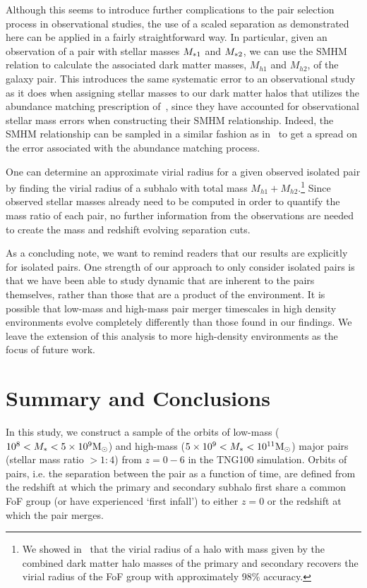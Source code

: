 \documentclass[twocolumn,linenumbers]{aastex631}
\newcommand{\chambe}{\citet{Chamberlain2024}}
\begin{document}
            Although this seems to introduce further complications to the pair selection process in observational studies, the use of a scaled separation as demonstrated here can be applied in a fairly straightforward way. 
            In particular, given an observation of a pair with stellar masses $M_{*{1}}$ and $M_{*{2}}$, we can use the SMHM relation to calculate the associated dark matter masses, $M_{h1}$ and $M_{h2}$, of the galaxy pair. 
            This introduces the same systematic error to an observational study as it does when assigning stellar masses to our dark matter halos that utilizes the abundance matching prescription of~\cite{Moster2013}, since they have accounted for observational stellar mass errors when constructing their SMHM relationship.
            Indeed, the SMHM relationship can be sampled in a similar fashion as in~\chambe{} to get a spread on the error associated with the abundance matching process.

            One can determine an approximate virial radius for a given observed isolated pair by finding the virial radius of a subhalo with total mass $M_{h1}+M_{h2}$.\footnote{We showed in~\chambe{} that the virial radius of a halo with mass given by the combined dark matter halo masses of the primary and secondary recovers the virial radius of the FoF group with approximately 98\% accuracy.}
            Since observed stellar masses already need to be computed in order to quantify the mass ratio of each pair, no further information from the observations are needed to create the mass and redshift evolving separation cuts. 

            As a concluding note, we want to remind readers that our results are explicitly for isolated pairs. 
            One strength of our approach to only consider isolated pairs is that we have been able to study dynamic that are inherent to the pairs themselves, rather than those that are a product of the environment. 
            It is possible that low-mass and high-mass pair merger timescales in high density environments evolve completely differently than those found in our findings. 
            We leave the extension of this analysis to more high-density environments as the focus of future work. 
   
\section{Summary and Conclusions}\label{sec:conclusions}
    In this study, we construct a sample of the orbits of low-mass ($10^8 <M_{*{}}<5\times10^{9}\mathrm{M}_\odot$) and high-mass ($5\times10^{9}<M_{*{}}<10^{11}\mathrm{M}_\odot$) major pairs (stellar mass ratio $> 1:4$) from $z=0-6$ in the TNG100 simulation.
    Orbits of pairs, i.e. the separation between the pair as a function of time, are defined from the redshift at which the primary and secondary subhalo  first share a common FoF group (or have experienced `first infall') to either $z=0$ or the redshift at which the pair merges.
    
\end{document}
